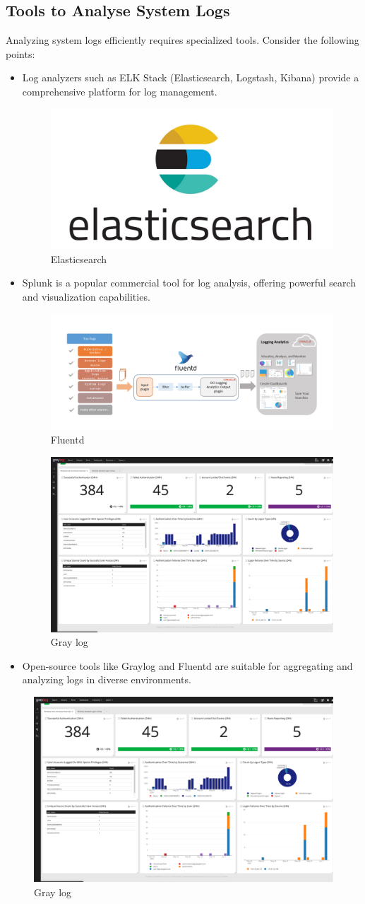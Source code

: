 \documentclass[11pt]{article}
\begin{document}
\subsection{Tools to Analyse System Logs}
Analyzing system logs efficiently requires specialized tools. Consider the following points:
\begin{itemize}
    \item Log analyzers such as ELK Stack (Elasticsearch, Logstash, Kibana) provide a comprehensive platform for log management.
    \begin{figure}[H]
        \centering
        \includegraphics[width=.45\textwidth]{elasticsearch/elasticsearch_0.jpg}
        \caption{Elasticsearch}
    \end{figure}
    \item Splunk is a popular commercial tool for log analysis, offering powerful search and visualization capabilities.
    
    \begin{figure}[H]
        \centering
        \includegraphics[width=.45\textwidth]{fluentd/fluentd_4.jpg}
        \caption{Fluentd}
    \end{figure}
    \begin{figure}[H]
        \centering
        \includegraphics[width=.45\textwidth]{graylog/graylog_4.jpg}
        \caption{Gray log}
    \end{figure}
    \item Open-source tools like Graylog and Fluentd are suitable for aggregating and analyzing logs in diverse environments.
\end{itemize}\begin{figure}[H]
    \centering
    \includegraphics[width=.45\textwidth]{graylog/graylog_4.jpg}
    \caption{Gray log}
\end{figure}
\end{document}

